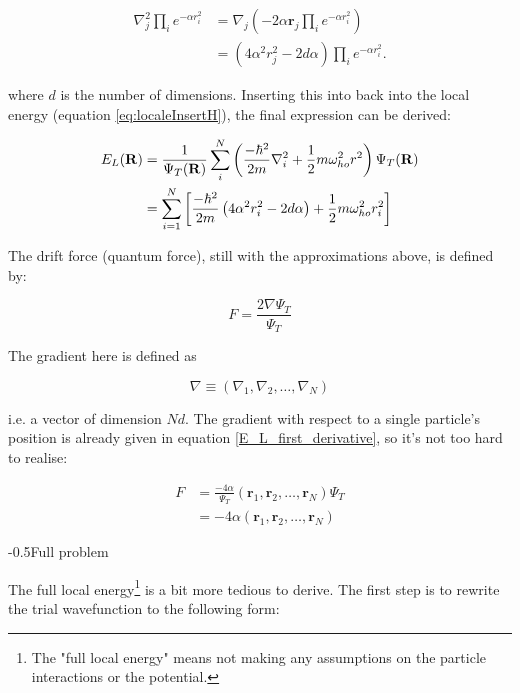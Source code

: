 \documentclass[english, a4paper]{article}
\makeatletter
\newcommand\lr[1]{\left(#1\right)}
\renewcommand{\subsubsection}{\@startsection{subsubsection}{3}{0pt}%
{-\baselineskip}{0.5\baselineskip}{\bf\large}}
\newcommand{\bm}[1]{\mathbf{#1}}
\makeatother
\begin{document}
\begin{align}
 \nabla_j^2 \prod_i e^{-\alpha r_i^2} 
 &= \nabla_j \lr{-2\alpha \bm{r}_j  \prod_i e^{-\alpha r_i^2}}\\
 &= \lr{4\alpha^2 r_j^2 - 2d\alpha}  \prod_i e^{-\alpha r_i^2}.	\label{simpleLaplacian}
\end{align}

where $d$ is the number of dimensions. Inserting this into back into the local energy (equation \eqref{eq:localeInsertH}), the final expression can be derived:

\begin{align}
\begin{split}
 E_L({\bf R}) &= \frac{1}{\Psi_T({\bf R})}\sum_i^N \lr{
	 \frac{-\hbar^2}{2m}
	 \nabla_{i}^2 +
	\frac{1}{2}m\omega_{ho}^2r^2}\Psi_T({\bf R})\\
    &= \sum_{i=1}^N\left[\frac{-\hbar^2}{2m}\lr{4\alpha^2 r_i^2 - 2d\alpha} + \frac{1}{2}m\omega_{ho}^2r_i^2\right] \label{SimpleLocalEnergies}
\end{split}
\end{align}



The drift force (quantum force), still with the approximations above, is defined by:

\begin{equation}
	F = \frac{2\nabla\Psi_T}{\Psi_T}
\end{equation}

The gradient here is defined as

\begin{equation*}
	\nabla \equiv \lr{\nabla_1,\nabla_2,\ldots,\nabla_N}
\end{equation*}

i.e. a vector of dimension $Nd$. The gradient with respect to a single particle's position is already given in equation \ref{E_L_first_derivative}, so it's not too hard to realise:

\begin{align*}
	F &= \frac{-4\alpha}{\Psi_T}\lr{\bm{r}_1,\bm{r}_2,\ldots,\bm{r}_N}\Psi_T\\
	&= -4\alpha\lr{\bm{r}_1,\bm{r}_2,\ldots,\bm{r}_N}
\end{align*}


\subsubsection{Full problem}

The full local energy\footnote{The "full local energy" means not making any assumptions on the particle interactions or the potential.} is a bit more tedious to derive. The first step is to rewrite the trial wavefunction to the following form:
\end{document}
